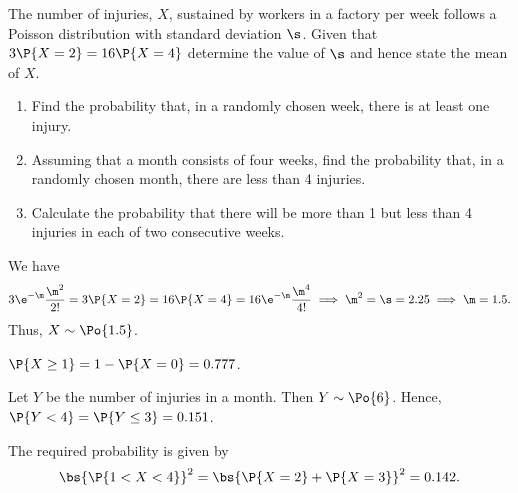 \begin{problem}
    The number of injuries, $X$, sustained by workers in a factory per week follows a Poisson distribution with standard deviation $\s$. Given that $3\P{X = 2} = 16\P{X = 4}$ determine the value of $\s$ and hence state the mean of $X$.
    \begin{enumerate}
        \item Find the probability that, in a randomly chosen week, there is at least one injury.
        \item Assuming that a month consists of four weeks, find the probability that, in a randomly chosen month, there are less than 4 injuries.
        \item Calculate the probability that there will be more than 1 but less than 4 injuries in each of two consecutive weeks.
    \end{enumerate}
\end{problem}
\begin{solution}
    We have \[3\e^{-\m} \frac{\m^2}{2!} = 3\P{X = 2} = 16\P{X = 4} = 16\e^{-\m} \frac{\m^4}{4!} \implies \m^2 = \s = 2.25 \implies \m = 1.5.\] Thus, $X \sim \Po{1.5}$.
    \begin{ppart}
        $\P{X \geq 1} = 1 - \P{X = 0} = 0.777$.
    \end{ppart}
    \begin{ppart}
        Let $Y$ be the number of injuries in a month. Then $Y \sim \Po{6}$. Hence, $\P{Y < 4} = \P{Y \leq 3} = 0.151$.
    \end{ppart}
    \begin{ppart}
        The required probability is given by \[\bs{\P{1 < X < 4}}^2 = \bs{\P{X = 2} + \P{X = 3}}^2 = 0.142.\]
    \end{ppart}
\end{solution}

